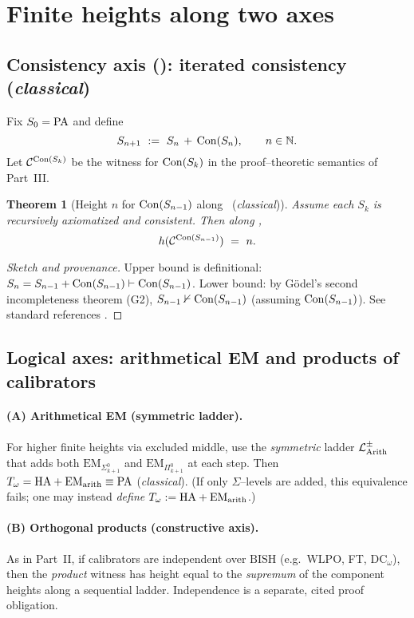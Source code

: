 \documentclass[11pt]{article}
\newtheorem{theorem}{Theorem}[section]
\theoremstyle{definition}
\theoremstyle{remark}
\newcommand{\WLPO}{\mathrm{WLPO}}
\newcommand{\BISH}{\mathrm{BISH}}
\begin{document}
\section{Finite heights along two axes}

\subsection{Consistency axis \texorpdfstring{(\LCons)}{(LCons)}: iterated consistency (\emph{classical})}
Fix $S_0=\mathrm{PA}$ and define
\[
S_{n+1}\ :=\ S_n\,+\,\mathrm{Con}(S_n),\qquad n\in\mathbb N.
\]
Let $\mathcal C^{\mathrm{Con}(S_{k})}$ be the witness for $\mathrm{Con}(S_k)$ in the proof--theoretic semantics of Part~III.

\begin{theorem}[Height $n$ for $\mathrm{Con}(S_{n-1})$ along \LCons\ (\emph{classical})]\label{IV:thm:finite-Con}
Assume each $S_k$ is recursively axiomatized and consistent. Then along \LCons,
\[
h(\mathcal C^{\Con(S_{n-1})})\ =\ n.
\]
\end{theorem}

\begin{proof}[Sketch and provenance]
Upper bound is definitional: $S_n=S_{n-1}+\mathrm{Con}(S_{n-1})\vdash \mathrm{Con}(S_{n-1})$.
Lower bound: by G\"odel's second incompleteness theorem (G2), $S_{n-1}\nvdash\mathrm{Con}(S_{n-1})$
(assuming $\mathrm{Con}(S_{n-1})$). See standard references \cite{HajekPudlak}.
\end{proof}

\subsection{Logical axes: arithmetical EM and products of calibrators}
\paragraph{(A) Arithmetical EM (symmetric ladder).}
For higher finite heights via excluded middle, use the \emph{symmetric} ladder
$\mathcal{L}_{\mathrm{Arith}}^{\pm}$ that adds both $\mathrm{EM}_{\Sigma^0_{k+1}}$ and $\mathrm{EM}_{\Pi^0_{k+1}}$ at each step.
Then $T_\omega=\mathrm{HA}+\mathrm{EM}_{\mathrm{arith}}\equiv \mathrm{PA}$ (\emph{classical}).
(If only $\Sigma$--levels are added, this equivalence fails; one may instead \emph{define}
$T_\omega:=\mathrm{HA}+\mathrm{EM}_{\mathrm{arith}}$.)

\paragraph{(B) Orthogonal products (constructive axis).}
As in Part~II, if calibrators are independent over \(\BISH\) (e.g.\ \(\WLPO\), FT, $\mathrm{DC}_\omega$),
then the \emph{product} witness has height equal to the \emph{supremum} of the component heights along a sequential ladder.
Independence is a separate, cited proof obligation.
\end{document}
